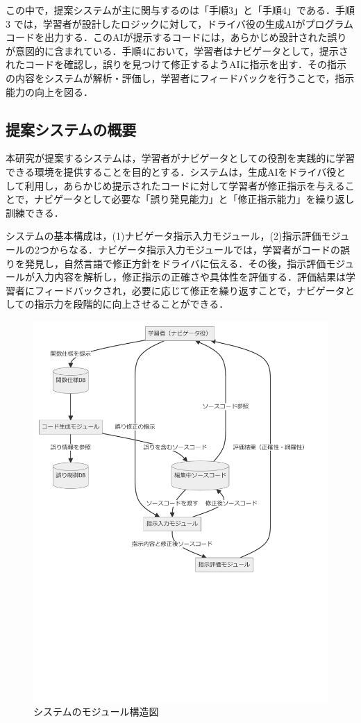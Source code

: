 \documentclass[twoside,twocolumn,10pt]{jsarticle}
\begin{document}
この中で，提案システムが主に関与するのは「手順3」と「手順4」である．手順3 では，学習者が設計したロジックに対して，ドライバ役の生成AIがプログラムコードを出力する．このAIが提示するコードには，あらかじめ設計された誤りが意図的に含まれている．手順4において，学習者はナビゲータとして，提示されたコードを確認し，誤りを見つけて修正するようAIに指示を出す．その指示の内容をシステムが解析・評価し，学習者にフィードバックを行うことで，指示能力の向上を図る．

\subsection{提案システムの概要}
本研究が提案するシステムは，学習者がナビゲータとしての役割を実践的に学習できる環境を提供することを目的とする．システムは，生成AIをドライバ役として利用し，あらかじめ提示されたコードに対して学習者が修正指示を与えることで，ナビゲータとして必要な「誤り発見能力」と「修正指示能力」を繰り返し訓練できる．

システムの基本構成は，(1)ナビゲータ指示入力モジュール，(2)指示評価モジュールの2つからなる．ナビゲータ指示入力モジュールでは，学習者がコードの誤りを発見し，自然言語で修正方針をドライバに伝える．その後，指示評価モジュールが入力内容を解析し，修正指示の正確さや具体性を評価する．評価結果は学習者にフィードバックされ，必要に応じて修正を繰り返すことで，ナビゲータとしての指示力を段階的に向上させることができる．

\begin{figure}[h]
  \centering
  \includegraphics[width=1\linewidth, trim=0 250 0 0, clip]{module.pdf}
  \caption{システムのモジュール構造図}
\end{figure}
\end{document}
